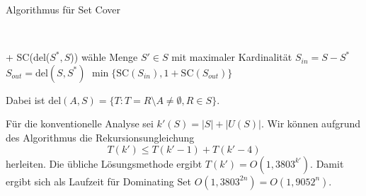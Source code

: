   \begin{algorithm}[H]
    \caption{Algorithmus für Set Cover}

     \\
    \KwResult{}

     {
       + SC(del(\(S^*, S\)))
    }
    wähle Menge \(S' \in S\) mit maximaler Kardinalität \;
     {
      \(S_{in} = S - S^*\)\;
      \(S_{out} = \text{del}(S, S^*)\)\;
      \Return \(\min\{ \text{SC}(S_{in}), 1 + \text{SC}(S_{out}) \}\)
    }
  \end{algorithm}

  Dabei ist \(\text{del}(A,S) = \{ T : T = R \setminus A \neq \emptyset, R \in S \}\).

  Für die konventionelle Analyse sei \(k'(S) = |S| + |U(S)|\). Wir können aufgrund des Algorithmus die Rekursionsungleichung
  \[ T(k') \leq T(k' - 1) + T(k' - 4) \]
  herleiten. Die übliche Lösungsmethode ergibt \(T(k') = O(1{,}3803^{k'})\). Damit ergibt sich als Laufzeit für Dominating Set \(O(1{,}3803^{2n}) = O(1{,}9052^n)\).

